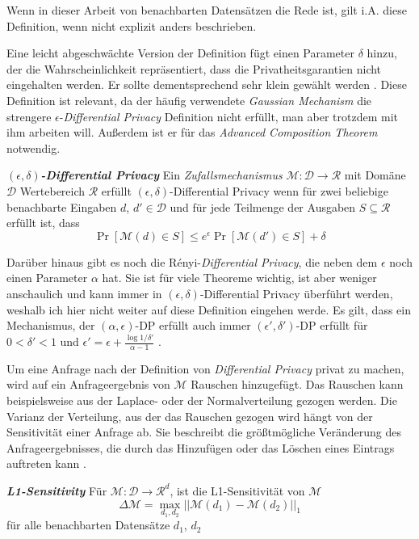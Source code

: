 Wenn in dieser Arbeit von benachbarten Datensätzen die Rede ist, gilt i.A. diese Definition, wenn nicht explizit anders beschrieben.

Eine leicht abgeschwächte Version der Definition fügt einen Parameter $\delta$ hinzu, der die Wahrscheinlichkeit repräsentiert, dass die Privatheitsgarantien nicht eingehalten werden. Er sollte dementsprechend sehr klein gewählt werden \cite{dwork:2014}. Diese Definition ist relevant, da der häufig verwendete \textit{Gaussian Mechanism} die strengere $\epsilon$-\textit{Differential Privacy} Definition nicht erfüllt, man aber trotzdem mit ihm arbeiten will. Außerdem ist er für das \textit{Advanced Composition Theorem} notwendig.

\begin{definition}\label{def:eps-delta-differential-privacy}
	\emph{\textbf{$(\epsilon, \delta)$-Differential Privacy}} Ein \textit{Zufallsmechanismus} $\mathcal{M}: \mathcal{D} \rightarrow \mathcal{R}$ mit Domäne $\mathcal{D}$ Wertebereich $\mathcal{R}$ erfüllt $(\epsilon, \delta)$-Differential Privacy wenn für zwei beliebige benachbarte Eingaben $d$, $d' \in \mathcal{D}$ und für jede Teilmenge der Ausgaben $S \subseteq \mathcal{R}$ erfüllt ist, dass $$\Pr[\mathcal{M}(d) \in S] \leq e^{\epsilon} \Pr[\mathcal{M}(d') \in S] + \delta$$
\end{definition}

Darüber hinaus gibt es noch die Rényi-\textit{Differential Privacy}, die neben dem $\epsilon$ noch einen Parameter $\alpha$ hat. Sie ist für viele Theoreme wichtig, ist aber weniger anschaulich und kann immer in $(\epsilon, \delta)$-Differential Privacy überführt werden, weshalb ich hier nicht weiter auf diese Definition eingehen werde. Es gilt, dass ein Mechanismus, der $(\alpha, \epsilon)$-DP erfüllt auch immer $(\epsilon', \delta')$-DP erfüllt für $0 < \delta' < 1$ und $\epsilon' = \epsilon + \frac{\log 1 / \delta'}{\alpha - 1}$ \cite{mironov:2017}.

Um eine Anfrage nach der Definition von \textit{Differential Privacy} privat zu machen, wird auf ein Anfrageergebnis von $\mathcal{M}$ Rauschen hinzugefügt. Das Rauschen kann beispielsweise aus der Laplace- oder der Normalverteilung gezogen werden. Die Varianz der Verteilung, aus der das Rauschen gezogen wird hängt von der Sensitivität einer Anfrage ab. Sie beschreibt die größtmögliche Veränderung des Anfrageergebnisses, die durch das Hinzufügen oder das Löschen eines Eintrags auftreten kann \cite{dwork:2006}.

\begin{definition}\label{def:l1-sensitivity}
	\emph{\textbf{L1-Sensitivity}} Für $\mathcal{M}: \mathcal{D} \rightarrow \mathcal{R}^{d}$, ist die L1-Sensitivität von $\mathcal{M}$
	$$
	\Delta \mathcal{M} = \max_{d_1, d_2}{||\mathcal{M}(d_1) - \mathcal{M}(d_2)||}_1
	$$
	für alle benachbarten Datensätze $d_1$, $d_2$
\end{definition}

